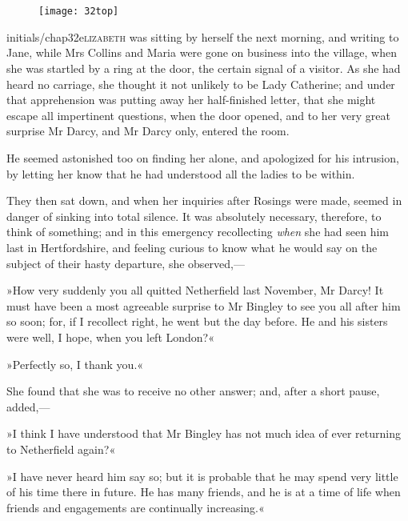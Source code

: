 \chapter[Chapter \thechapter]{}
	
\begin{figure}[t!]
\centering
\texttt{[image: 32top]}
\end{figure}


\lettrine[lines=6,image=true]{initials/chap32e}{lizabeth} was sitting by herself the next morning, and writing to Jane, while Mrs Collins and Maria were gone on business into the village, when she was startled by a ring at the door, the certain signal of a visitor. As she had heard no carriage, she thought it not unlikely to be Lady Catherine; and under that apprehension was putting away her half-finished letter, that she might escape all impertinent questions, when the door opened, and to her very great surprise Mr Darcy, and Mr Darcy only, entered the room.

He seemed astonished too on finding her alone, and apologized for his intrusion, by letting her know that he had understood all the ladies to be within.

They then sat down, and when her inquiries after Rosings were made, seemed in danger of sinking into total silence. It was absolutely necessary, therefore, to think of something; and in this emergency recollecting \textit{when} she had seen him last in Hertfordshire, and feeling curious to know what he would say on the subject of their hasty departure, she observed,—

»How very suddenly you all quitted Netherfield last November, Mr Darcy! It must have been a most agreeable surprise to Mr Bingley to see you all after him so soon; for, if I recollect right, he went but the day before. He and his sisters were well, I hope, when you left London?«

»Perfectly so, I thank you.«

She found that she was to receive no other answer; and, after a short pause, added,—

»I think I have understood that Mr Bingley has not much idea of ever returning to Netherfield again?«

»I have never heard him say so; but it is probable that he may spend very little of his time there in future. He has many friends, and he is at a time of life when friends and engagements are continually increasing.«


